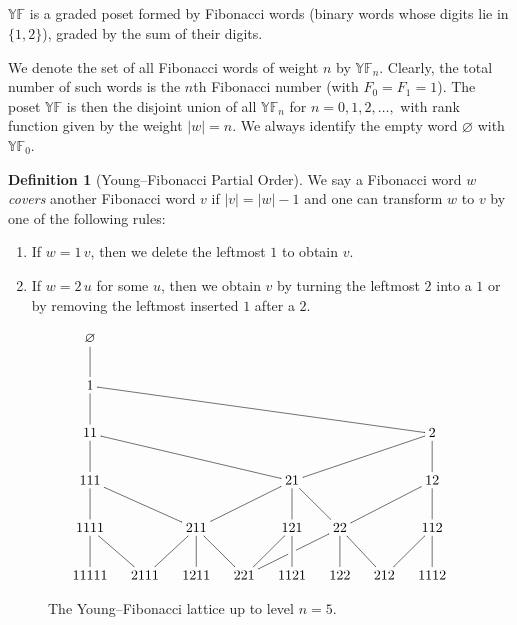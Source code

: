 \documentclass[letterpaper,11pt,oneside,reqno]{article}
\numberwithin{equation}{section}
\theoremstyle{definition}
\newtheorem{definition}[proposition]{Definition}
\begin{document}
\subsection{}

$\mathbb{YF}$ is a graded poset formed
by Fibonacci words (binary words whose digits lie in
$\{1,2\}$), graded by the sum of their digits.

We denote the set of all Fibonacci words of weight $n$ by
$\mathbb{YF}_n$. Clearly, the total number of such words is
the $n$th Fibonacci number (with $F_0 = F_1 = 1$). The poset
$\mathbb{YF}$ is then the disjoint union of all
$\mathbb{YF}_n$ for $n = 0,1,2,\ldots,$ with rank function
given by the weight $|w| = n$. We always identify the empty
word $\varnothing$ with $\mathbb{YF}_0$.

\begin{definition}[Young--Fibonacci Partial Order]
\label{def:YF-partial-order}
We say a Fibonacci word $w$ \emph{covers} another Fibonacci word $v$ if $|v| = |w| - 1$ and one can transform $w$ to $v$ by one of the following rules:
\begin{enumerate}
\item If $w = 1 \,v$, then we delete the leftmost $1$ to obtain $v$.
\item If $w = 2 \,u$ for some $u$, then we obtain $v$ by turning the leftmost $2$ into a $1$ or by removing the leftmost inserted $1$ after a $2$.
\end{enumerate}
\end{definition}

\begin{figure}[htpb]
	\centering
	\begin{equation*}
		\xymatrixrowsep{0.3in}
		\xymatrixcolsep{0.15in}
		\xymatrix{ \varnothing \ar@{-}[d] & & & & & & &  \\
		1 \ar@{-}[d] \ar@{-}[drrrrrrr] & & & & & & & \\
		11  \ar@{-}[d] \ar@{-}[drrrr] & & & & & & & 2  \ar@{-}[d] \ar@{-}[dlll] \\
		111  \ar@{-}[d] \ar@{-}[drr] & & & & 21 \ar@{-}[d] \ar@{-}[dll] \ar@{-}[dr] & & & 12  \ar@{-}[d] \ar@{-}[dll] \\
		1111  \ar@{-}[d] \ar@{-}[dr]  & &211  \ar@{-}[d] \ar@{-}[dl] \ar@{-}[dr] & &121 \ar@{-}[d] \ar@{-}[dl]  &22 \ar@{-}[d] \ar@{-}[dll]|\hole \ar@{-}[dr]
		& &112  \ar@{-}[d] \ar@{-}[dl]  \\
		11111 & 2111 & 1211 & 221 & 1121 & 122 & 212 & 1112 }
	\end{equation*}
	\caption{The Young--Fibonacci lattice up to level $n=5$.}
	\label{fig:YF_lattice}
\end{figure}
\end{document}

